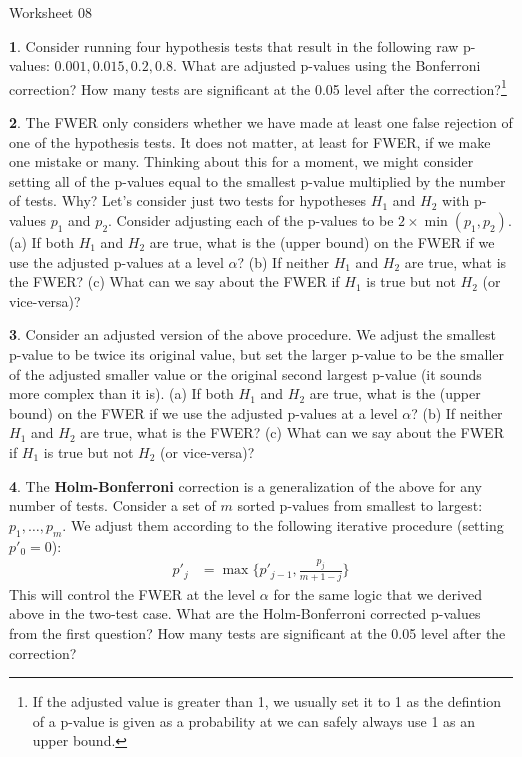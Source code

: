 \documentclass{tufte-handout}
\begin{document}
\justify

{\LARGE Worksheet 08}

\vspace*{18pt}


\textbf{1}. Consider running four hypothesis tests that result in the following raw
p-values: $0.001, 0.015, 0.2, 0.8$. What are adjusted p-values using the
Bonferroni correction? How many tests are significant at the 0.05 level
after the correction?\footnote{
  If the adjusted value is greater than 1, we usually set it
  to 1 as the defintion of a p-value is given as a probability
  at we can safely always use 1 as an upper bound.
}

\textbf{2}. The FWER only considers whether we have made at least one false rejection
of one of the hypothesis tests. It does not matter, at least for FWER, if
we make one mistake or many. Thinking about this for a moment, we might
consider setting all of the p-values equal to the smallest p-value multiplied
by the number of tests. Why? Let's consider just two tests for hypotheses
$H_1$ and $H_2$ with p-values $p_1$ and $p_2$. Consider adjusting each 
of the p-values to be $2 \times \min(p_1, p_2)$. (a) If both $H_1$ and $H_2$
are true, what is the (upper bound) on the FWER if we use the adjusted
p-values at a level $\alpha$? (b) If neither $H_1$ and $H_2$ are true,
what is the FWER? (c) What can we say about the FWER if $H_1$ is true
but not $H_2$ (or vice-versa)?

\textbf{3}. Consider an adjusted version of the above procedure. We adjust the smallest 
p-value to be twice its original value, but set the larger p-value to be
the smaller of the adjusted smaller value or the original second largest
p-value (it sounds more complex than it is). (a) If both $H_1$ and $H_2$
are true, what is the (upper bound) on the FWER if we use the adjusted
p-values at a level $\alpha$? (b) If neither $H_1$ and $H_2$ are true,
what is the FWER? (c) What can we say about the FWER if $H_1$ is true
but not $H_2$ (or vice-versa)?

\textbf{4}. The \textbf{Holm-Bonferroni} correction is a generalization of the above
for any number of tests. Consider a set of $m$ sorted p-values from smallest
to largest: $p_1, \ldots, p_m$. We adjust them according to the following
iterative procedure (setting $p'_0 = 0$):
\begin{align*}
p'_j &= \max\{ p'_{j-1}, \frac{p_j}{m + 1 - j} \}
\end{align*}
This will control the FWER at the level $\alpha$ for the same logic that we
derived above in the two-test case. What are the Holm-Bonferroni corrected
p-values from the first question? How many tests are significant at the 0.05
level after the correction?
\end{document}
